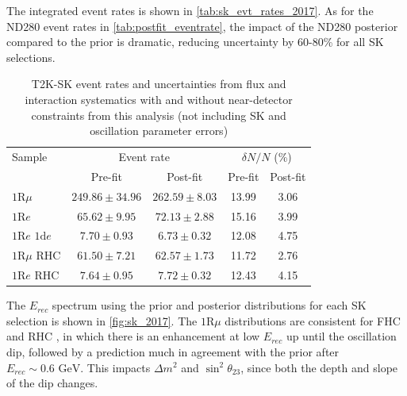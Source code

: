 The integrated event rates is shown in \autoref{tab:sk_evt_rates_2017}. As for the ND280 event rates in \autoref{tab:postfit_eventrate}, the impact of the ND280 posterior compared to the prior is dramatic, reducing uncertainty by 60-80\% for all SK selections.
\begin{table}[h]
	\begin{tabular}{l | c c | c c}
		\hline
		\hline
		Sample & \multicolumn{2}{c|}{Event rate} & \multicolumn{2}{c}{$\delta N/N$ (\%)} \\
		& Pre-fit & Post-fit & Pre-fit & Post-fit \\
		\hline
		$1\text{R}\mu$ & $249.86\pm34.96$ & $262.59\pm8.03$ & 13.99 & 3.06 \\
		$1\text{R}e$ & $65.62\pm9.95$ & $72.13\pm2.88$ & 15.16 &  3.99   \\
		$1\text{R}e \text{ 1d}e$ & $7.70\pm0.93$ & $6.73\pm0.32$ & 12.08 & 4.75  \\
		
		$1\text{R}\mu \text{ RHC}$ & $61.50\pm7.21$ & $62.57\pm1.73$ & 11.72 & 2.76 \\
		$1\text{R}e \text{ RHC}$ & $7.64\pm0.95$ & $7.72\pm0.32$ & 12.43 & 4.15  \\
		\hline
		\hline
	\end{tabular}
\caption{T2K-SK event rates and uncertainties from flux and interaction systematics with and without near-detector constraints from this analysis (not including SK and oscillation parameter errors)}
\label{tab:sk_evt_rates_2017}
\end{table}

The $E_{rec}$ spectrum using the prior and posterior distributions for each SK selection is shown in \autoref{fig:sk_2017}. The $1\text{R}\mu$ distributions are consistent for FHC and RHC , in which there is an enhancement at low $E_{rec}$ up until the oscillation dip, followed by a prediction much in agreement with the prior after $E_{rec}\sim0.6\text{ GeV}$. This impacts $\Delta m^2$ and $\sin^2\theta_{23}$, since both the depth and slope of the dip changes. 

